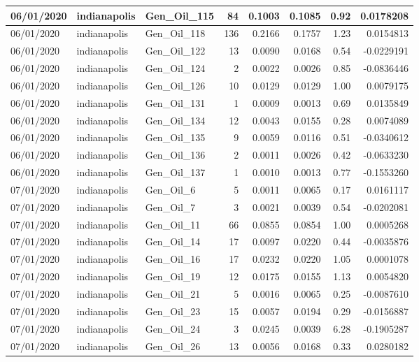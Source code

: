 \documentclass[
  letterpaper,
  DIV=11,
  numbers=noendperiod]{scrartcl}
\begin{document}
\begin{tabular}{l|l|l|r|r|r|r|r}
\hline
06/01/2020 & indianapolis & Gen\_Oil\_115 & 84 & 0.1003 & 0.1085 & 0.92 & 0.0178208\\
\hline
06/01/2020 & indianapolis & Gen\_Oil\_118 & 136 & 0.2166 & 0.1757 & 1.23 & 0.0154813\\
\hline
06/01/2020 & indianapolis & Gen\_Oil\_122 & 13 & 0.0090 & 0.0168 & 0.54 & -0.0229191\\
\hline
06/01/2020 & indianapolis & Gen\_Oil\_124 & 2 & 0.0022 & 0.0026 & 0.85 & -0.0836446\\
\hline
06/01/2020 & indianapolis & Gen\_Oil\_126 & 10 & 0.0129 & 0.0129 & 1.00 & 0.0079175\\
\hline
06/01/2020 & indianapolis & Gen\_Oil\_131 & 1 & 0.0009 & 0.0013 & 0.69 & 0.0135849\\
\hline
06/01/2020 & indianapolis & Gen\_Oil\_134 & 12 & 0.0043 & 0.0155 & 0.28 & 0.0074089\\
\hline
06/01/2020 & indianapolis & Gen\_Oil\_135 & 9 & 0.0059 & 0.0116 & 0.51 & -0.0340612\\
\hline
06/01/2020 & indianapolis & Gen\_Oil\_136 & 2 & 0.0011 & 0.0026 & 0.42 & -0.0633230\\
\hline
06/01/2020 & indianapolis & Gen\_Oil\_137 & 1 & 0.0010 & 0.0013 & 0.77 & -0.1553260\\
\hline
07/01/2020 & indianapolis & Gen\_Oil\_6 & 5 & 0.0011 & 0.0065 & 0.17 & 0.0161117\\
\hline
07/01/2020 & indianapolis & Gen\_Oil\_7 & 3 & 0.0021 & 0.0039 & 0.54 & -0.0202081\\
\hline
07/01/2020 & indianapolis & Gen\_Oil\_11 & 66 & 0.0855 & 0.0854 & 1.00 & 0.0005268\\
\hline
07/01/2020 & indianapolis & Gen\_Oil\_14 & 17 & 0.0097 & 0.0220 & 0.44 & -0.0035876\\
\hline
07/01/2020 & indianapolis & Gen\_Oil\_16 & 17 & 0.0232 & 0.0220 & 1.05 & 0.0001078\\
\hline
07/01/2020 & indianapolis & Gen\_Oil\_19 & 12 & 0.0175 & 0.0155 & 1.13 & 0.0054820\\
\hline
07/01/2020 & indianapolis & Gen\_Oil\_21 & 5 & 0.0016 & 0.0065 & 0.25 & -0.0087610\\
\hline
07/01/2020 & indianapolis & Gen\_Oil\_23 & 15 & 0.0057 & 0.0194 & 0.29 & -0.0156887\\
\hline
07/01/2020 & indianapolis & Gen\_Oil\_24 & 3 & 0.0245 & 0.0039 & 6.28 & -0.1905287\\
\hline
07/01/2020 & indianapolis & Gen\_Oil\_26 & 13 & 0.0056 & 0.0168 & 0.33 & 0.0280182\\

\end{tabular}
\end{document}
